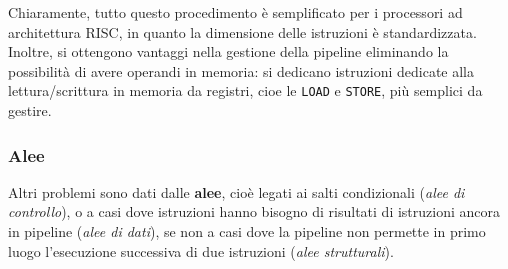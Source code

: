 \documentclass[a4paper,11pt]{article}
\begin{document}
Chiaramente, tutto questo procedimento è semplificato per i processori ad architettura RISC, in quanto la dimensione delle istruzioni è standardizzata.
Inoltre, si ottengono vantaggi nella gestione della pipeline eliminando la possibilità di avere operandi in memoria: si dedicano istruzioni dedicate alla lettura/scrittura in memoria da registri, cioe le \lstinline|LOAD| e \lstinline|STORE|, più semplici da gestire. 

\subsubsection{Alee}

Altri problemi sono dati dalle \textbf{alee}, cioè legati ai salti condizionali (\textit{alee di controllo}), o a casi dove istruzioni hanno bisogno di risultati di istruzioni ancora in pipeline (\textit{alee di dati}), se non a casi dove la pipeline non permette in primo luogo l'esecuzione successiva di due istruzioni (\textit{alee strutturali}).
\end{document}
